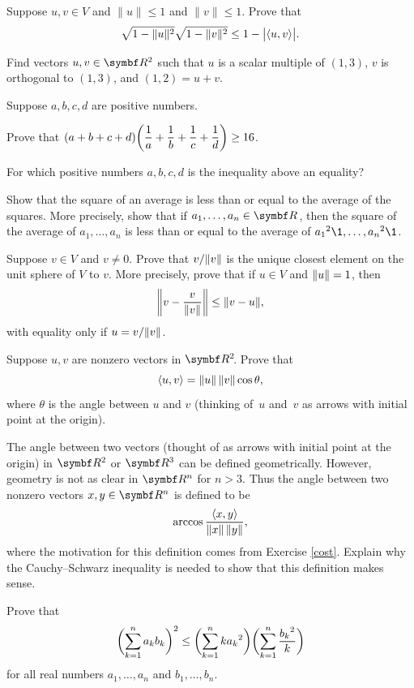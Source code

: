 \begin{exercises}
\exercise
Suppose $u, v \in V$ and $\|u\| \le 1$ and $\|v\| \le 1$. Prove that
\[
\sqrt{ 1 - \|u\|^2} \sqrt{ 1 - \|v\|^2} \le 1 - \abs[\big]{\ip{u, v}}.
\]
\exercisedisplayend


\exercise
Find vectors $u, v \in \R{2}$ such that $u$ is a scalar multiple of $(1,3)$, $v$ is orthogonal to $(1,3)$, and $(1,2) = u + v$.


\exercise
Suppose $a, b, c, d$ are positive numbers.
\begin{subtheorem}
\item
Prove that
$ \displaystyle
(a + b + c + d)\paren[\bigg]{\frac{1}{a} + \frac{1}{b} + \frac{1}{c} + \frac{1}{d}} \ge 16$.
\item
For which positive numbers $a, b, c, d$ is the inequality above an equality?
\end{subtheorem}
\exercisesubtheoremend


\exercise
Show that the square of an average is less than or equal to the average of the squares. More precisely, show that if $a_1, \dots , a_n \in \R{}$, then the square of the average of $a_1, \dots , a_n$ is less than or equal to the average of ${a_1}^{2}\1, \dots, {a_n}^{2}\1$.


\exercise
Suppose $v \in V$ and $v \ne 0$. Prove that $v / \norm{v}$ is the unique closest element on the unit sphere of $V$ to $v$. More precisely, prove that if $u \in V$ and $\norm{u} = 1$, then
\[
\norm[\bigg]{ v - \frac{v}{\norm{v}} } \le \norm{v - u},
\]
with equality only if $u = v / \norm{v}$.


\exercise
Suppose $u, v$ are nonzero vectors in $\RR{2}$. Prove that \label{cost}
\[
\ip{u, v} = \|u\| \, \|v\| \cos \theta,
\]
where $\theta$ is the angle between $u$ and $v$ (thinking of~$u$ and~$v$ as arrows
with initial point at the origin).


\exercise
The angle between two vectors (thought of as arrows with initial point at the origin) in $\R2$ or $\R3$ can be defined geometrically. However, geometry is not as clear in $\R{n}$ for $n > 3$. Thus the angle between two nonzero vectors $x, y \in \R{n}$ is defined to be
\vspace{-.1in}
\[
\arccos \frac{ \ip{x, y} }{ \|x\| \,\|y\| },
\]
where the motivation for this definition comes from Exercise \ref{cost}.
Explain why the Cauchy--Schwarz inequality is needed to show that this definition makes sense.


\exercise
Prove that
\[
\paren[\bigg]{ \sum_{k=1}^n a_k b_k }^2
\le \paren[\bigg]{ \sum_{k=1}^n  k {a_k}^{2} }  \paren[\bigg]{\sum_{k=1}^n \frac{{b_k}^{2}}{k} }
\]
for all real numbers $a_1, \dots, a_n$ and $b_1, \dots, b_n$.



\end{exercises}
